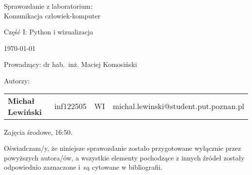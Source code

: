 \thispagestyle{empty} %

\begin{center}
{\large{Sprawozdanie z laboratorium:\\
Komunikacja człowiek-komputer\\
}}

\vspace{3ex}

Część I: Python i wizualizacja

\vspace{3ex}
{\footnotesize\today}

\end{center}


\vspace{10ex}

Prowadzący: dr hab.~inż. Maciej Komosiński

\vspace{5ex}

Autorzy:
\begin{tabular}{lllr}
\textbf{Michał Lewiński} & inf122505 & WI & michal.lewinski@student.put.poznan.pl \\
\end{tabular}

\vspace{5ex}

Zajęcia środowe, 16:50.

\vspace{35ex}

\noindent Oświadczam/y, że niniejsze sprawozdanie zostało przygotowane wyłącznie przez powyższych autora/ów,
a wszystkie elementy pochodzące z innych źródeł zostały odpowiednio zaznaczone i~są cytowane w bibliografii.

\newpage
